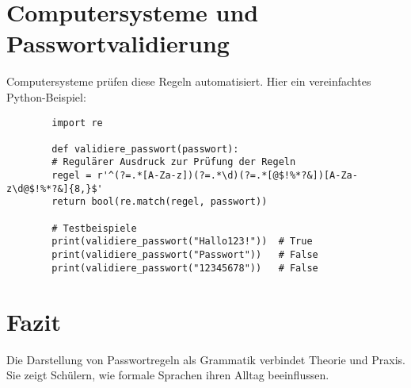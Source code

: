 \documentclass[a4paper,12pt]{article}
\begin{document}
	\section{Computersysteme und Passwortvalidierung}
	Computersysteme prüfen diese Regeln automatisiert. Hier ein vereinfachtes Python-Beispiel:
	
	\begin{lstlisting}
		import re
		
		def validiere_passwort(passwort):
		# Regulärer Ausdruck zur Prüfung der Regeln
		regel = r'^(?=.*[A-Za-z])(?=.*\d)(?=.*[@$!%*?&])[A-Za-z\d@$!%*?&]{8,}$'
		return bool(re.match(regel, passwort))
		
		# Testbeispiele
		print(validiere_passwort("Hallo123!"))  # True
		print(validiere_passwort("Passwort"))   # False
		print(validiere_passwort("12345678"))   # False
	\end{lstlisting}
	
	\section{Fazit}
	Die Darstellung von Passwortregeln als Grammatik verbindet Theorie und Praxis. Sie zeigt Schülern, wie formale Sprachen ihren Alltag beeinflussen.
	
\end{document}
